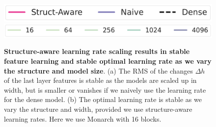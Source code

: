 \documentclass{article}
\theoremstyle{plain}
\theoremstyle{definition}
\theoremstyle{remark}
\begin{document}
\begin{figure}[!t]
\centering
    \includegraphics[width=0.38\linewidth]{figs/width_vs_dh_legend.pdf}
    \hspace{10mm}
    \includegraphics[width=0.45\linewidth]{figs/lr_landscape_legend.pdf}
    \\
   \caption{
   \textbf{Structure-aware learning rate scaling results in stable feature learning and stable optimal learning rate as we vary the structure and model size}. (a) The RMS of the changes $\Delta h$ of the last layer features is stable as the models are scaled up in width, but is smaller or vanishes if we naively use the learning rate for the dense model. (b) The optimal learning rate is stable as we vary the structure and width, provided we use structure-aware learning rates. Here we use Monarch with 16 blocks.
   }
    \label{fig:act}
    \vspace{-5mm}
\end{figure}
\end{document}
